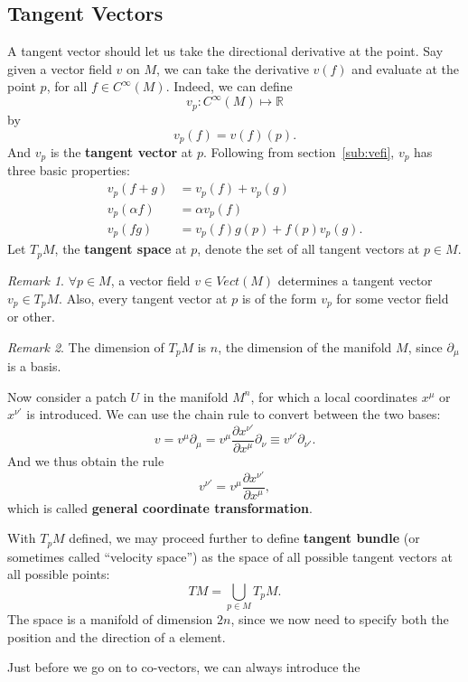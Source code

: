\documentclass[a4paper,11pt]{article}
\theoremstyle{remark}
\newtheorem{remark}{Remark}[section]
\begin{document}
\subsection{Tangent Vectors}
\label{sub:TV}
A tangent vector should let us take the directional derivative at the
point. Say given a vector field $v$ on $M$, we can take the derivative
$v(f)$ and evaluate at the point $p$, for all $f \in
C^{\infty}(M)$. Indeed, we can define $$v_p: C^{\infty}(M)\mapsto
\mathbb{R}$$ by $$v_p(f)=v(f)(p).$$ And $v_p$ is the \textbf{tangent vector} at
$p$. Following from section~\ref{sub:vefi}, $v_p$ has three basic properties:
\begin{align*}
  v_p (f+g) &= v_p(f) + v_p(g) \\
  v_p(\alpha f) &= \alpha v_p(f) \\
  v_p(f g) &= v_p(f)g(p) + f(p)v_p(g).
\end{align*}
Let $T_pM$, the \textbf{tangent space} at $p$, denote the set of all
tangent vectors at $p\in M$. \par
\begin{remark}
  $\forall p\in M$, a vector field $v\in Vect(M)$ determines a tangent
  vector $v_p\in T_pM$. Also, every tangent vector at $p$ is of the
  form $v_p$ for some vector field or other.\par
\end{remark}
\begin{remark}
  The dimension of $T_pM$ is $n$, the dimension of the manifold
  $M$, since ${\partial_{\mu}}$ is a basis. \par
\end{remark}
Now consider a patch $U$ in the manifold $M^n$, for which a local
coordinates $x^{\mu}$ or $x^{\nu '}$ is introduced. We can use the
chain rule to convert between the two bases:$$v =
v^{\mu}\partial_{\mu} = v^{\mu}\frac{\partial x^{\nu '}}{\partial
  x^{\mu}}\partial_{\nu}\equiv v^{\nu '}\partial_{\nu '}.$$
And we thus obtain the rule$$v^{\nu '} = v^{\mu}\frac{\partial x^{\nu '}}{\partial
  x^{\mu}},$$ which is called \textbf{general coordinate
  transformation}.\par
With $T_pM$ defined, we may proceed further to define \textbf{tangent
  bundle} (or sometimes called ``velocity space'') as the space of all
possible tangent vectors at all possible 
points:$$TM = \bigcup_{p\in M}T_pM.$$ The space is a manifold of
dimension $2n$, since we now need to specify both the position and the
direction of a element.\par
Just before we go on to co-vectors, we can always introduce the
\end{document}

